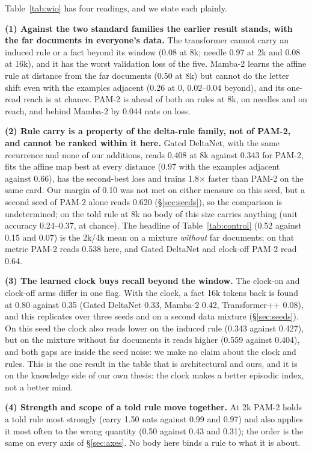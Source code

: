 \documentclass[11pt]{article}
\newcommand{\arch}{PAM-2}
\newcommand{\tpp}{Transformer++}
\newcommand{\mamba}{Mamba-2}
\begin{document}
Table~\ref{tab:wio} has four readings, and we state each plainly.

\textbf{(1) Against the two standard families the earlier result stands, with the far documents in everyone's data.} The transformer cannot carry an induced rule or a fact beyond its window (0.08 at 8k; needle 0.97 at 2k and 0.08 at 16k), and it has the worst validation loss of the five. \mamba{} learns the affine rule at distance from the far documents (0.50 at 8k) but cannot do the letter shift even with the examples adjacent (0.26 at 0, 0.02--0.04 beyond), and its one-read reach is at chance. \arch{} is ahead of both on rules at 8k, on needles and on reach, and behind \mamba{} by 0.044 nats on loss.

\textbf{(2) Rule carry is a property of the delta-rule family, not of \arch, and cannot be ranked within it here.} Gated DeltaNet, with the same recurrence and none of our additions, reads 0.408 at 8k against 0.343 for \arch, fits the affine map best at every distance (0.97 with the examples adjacent against 0.66), has the second-best loss and trains 1.8$\times$ faster than \arch{} on the same card. Our margin of 0.10 was not met on either measure on this seed, but a second seed of \arch{} alone reads 0.620 (\S\ref{sec:seeds}), so the comparison is undetermined; on the told rule at 8k no body of this size carries anything (unit accuracy 0.24--0.37, at chance). The headline of Table~\ref{tab:control} (0.52 against 0.15 and 0.07) is the 2k/4k mean on a mixture \emph{without} far documents; on that metric \arch{} reads 0.538 here, and Gated DeltaNet and clock-off \arch{} read 0.64.

\textbf{(3) The learned clock buys recall beyond the window.} The clock-on and clock-off arms differ in one flag. With the clock, a fact 16k tokens back is found at 0.80 against 0.35 (Gated DeltaNet 0.33, \mamba{} 0.42, \tpp{} 0.08), and this replicates over three seeds and on a second data mixture (\S\ref{sec:seeds}). On this seed the clock also reads lower on the induced rule (0.343 against 0.427), but on the mixture without far documents it reads higher (0.559 against 0.404), and both gaps are inside the seed noise: we make no claim about the clock and rules. This is the one result in the table that is architectural and ours, and it is on the knowledge side of our own thesis: the clock makes a better episodic index, not a better mind.

\textbf{(4) Strength and scope of a told rule move together.} At 2k \arch{} holds a told rule most strongly (carry 1.50 nats against 0.99 and 0.97) and also applies it most often to the wrong quantity (0.50 against 0.43 and 0.31); the order is the same on every axis of \S\ref{sec:axes}. No body here binds a rule to what it is about.
\end{document}

